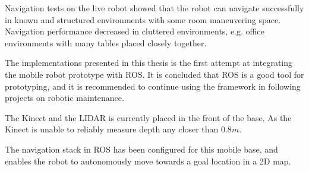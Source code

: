 Navigation tests on the live robot showed that the robot can navigate successfully in known and structured environments with some room maneuvering space. Navigation performance decreased in cluttered environments, e.g. office environments with many tables placed closely together.

The implementations presented in this thesis is the first attempt at integrating the mobile robot prototype with \ac{ROS}. It is concluded that  \ac{ROS} is a good tool for prototyping, and it is recommended to continue using the framework in following projects on robotic maintenance.



The Kinect and the LIDAR is currently placed in the front of the base. As the Kinect is unable to reliably measure depth any closer than $0.8 m$.

The navigation stack in \ac{ROS} has been configured for this mobile base, and enables the robot to autonomously move towards a goal location in a 2D map. 

